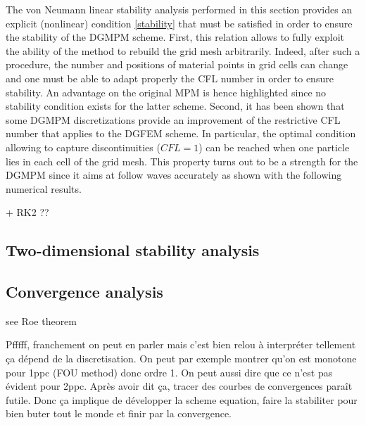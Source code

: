 The von Neumann linear stability analysis performed in this section provides an explicit (nonlinear) condition \eqref{stability} that must be satisfied in order to ensure the stability of the DGMPM scheme. First, this relation allows to fully exploit the ability of the method to rebuild the grid mesh arbitrarily. Indeed, after such a procedure, the number and positions of material points in grid cells can change and one must be able to adapt properly the CFL number in order to ensure stability. An advantage on the original MPM is hence highlighted since no stability condition exists for the latter scheme. Second, it has been shown that some DGMPM discretizations provide an improvement of the restrictive CFL number that applies to the DGFEM scheme. In particular, the optimal condition allowing to capture discontinuities ($CFL=1$) can be reached when one particle lies in each cell of the grid mesh. This property turns out to be a strength for the DGMPM since it aims at follow waves accurately as shown with the following numerical results.


+ RK2 ??
\subsection{Two-dimensional stability analysis}


\subsection{Convergence analysis}
see Roe theorem \cite[p.417]{Toro}


Pfffff, franchement on peut en parler mais c'est bien relou à interpréter tellement ça dépend de la discretisation. On peut par exemple montrer qu'on est monotone pour 1ppc (FOU method) donc ordre 1. On peut aussi dire que ce n'est pas évident pour 2ppc. Après avoir dit ça, tracer des courbes de convergences paraît futile. Donc ça implique de développer la scheme equation, faire la stabiliter pour bien buter tout le monde et finir par la convergence.

